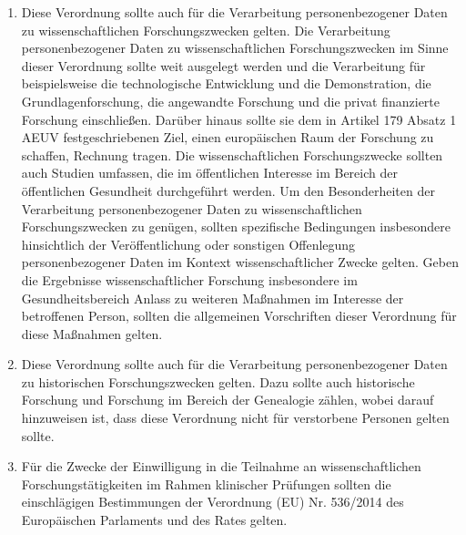 \begin{enumerate}

   \item Diese Verordnung sollte auch für die Verarbeitung personenbezogener Daten zu wissenschaftlichen
    Forschungszwecken gelten. Die Verarbeitung personenbezogener Daten zu wissenschaftlichen Forschungszwecken im Sinne
    dieser Verordnung sollte weit ausgelegt werden und die Verarbeitung für beispielsweise die technologische
    Entwicklung und die Demonstration, die Grundlagenforschung, die angewandte Forschung und die privat finanzierte
    Forschung einschließen. Darüber hinaus sollte sie dem in Artikel 179 Absatz 1 AEUV festgeschriebenen Ziel, einen
    europäischen Raum der Forschung zu schaffen, Rechnung tragen. Die wissenschaftlichen Forschungszwecke sollten auch
    Studien umfassen, die im öffentlichen Interesse im Bereich der öffentlichen Gesundheit durchgeführt werden. Um den
    Besonderheiten der Verarbeitung personenbezogener Daten zu wissenschaftlichen Forschungszwecken zu genügen, sollten
    spezifische Bedingungen insbesondere hinsichtlich der Veröffentlichung oder sonstigen Offenlegung personenbezogener
    Daten im Kontext wissenschaftlicher Zwecke gelten. Geben die Ergebnisse wissenschaftlicher Forschung insbesondere
    im Gesundheitsbereich Anlass zu weiteren Maßnahmen im Interesse der betroffenen Person, sollten die allgemeinen
    Vorschriften dieser Verordnung für diese Maßnahmen gelten.%
   \label{itm:eg-159}
   

   \item Diese Verordnung sollte auch für die Verarbeitung personenbezogener Daten zu historischen Forschungszwecken
    gelten. Dazu sollte auch historische Forschung und Forschung im Bereich der Genealogie zählen, wobei darauf
    hinzuweisen ist, dass diese Verordnung nicht für verstorbene Personen gelten sollte.%
   \label{itm:eg-160}
   

   \item Für die Zwecke der Einwilligung in die Teilnahme an wissenschaftlichen Forschungstätigkeiten im Rahmen
    klinischer Prüfungen sollten die einschlägigen Bestimmungen der Verordnung (EU) Nr. 536/2014 des Europäischen
    Parlaments und des Rates gelten.%
   \label{itm:eg-161}
   

\end{enumerate}
